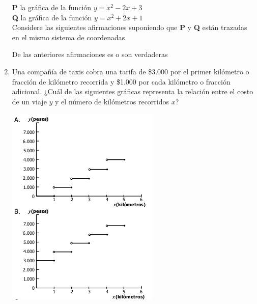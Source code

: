 \documentclass[10pt,twoside]{article}
\begin{document}
\begin{enumerate}
  \textbf{P} la gráfica de la función $ y=x^2-2x+3 $\\
  \textbf{Q} la gráfica de la función $ y=x^2+2x+1 $\\
  Considere las siguientes afirmaciones suponiendo que \textbf{P} y \textbf{Q} están trazadas en el mismo sistema de coordenadas
  \begin{itemize}
  \end{itemize}
      De las anteriores afirmaciones es o son verdaderas
    \begin{enumerate}
    \end{enumerate}
  \item Una compañía de taxis cobra una tarifa de \$3.000 por el primer kilómetro o fracción de kilómetro recorrida y \$1.000 por cada kilómetro o fracción adicional. ¿Cuál de las siguientes gráficas representa la relación entre el costo de un viaje $y$ y el número de kilómetros recorridos $x$?\\
\begin{minipage}{0.45\textwidth}
  \includegraphics[scale=.65]{Images/grafica-taxi.png}

\end{minipage}
\end{enumerate}
\end{document}
